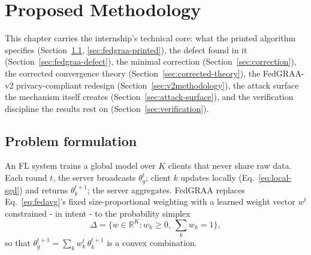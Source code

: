 \documentclass[11pt,a4paper]{report}
\newcommand{\simplex}{\Delta}
\begin{document}
\chapter{Proposed Methodology}
\label{ch:methodology}

This chapter carries the internship's technical core: what the printed
algorithm specifies (Section~\ref{sec:problem}, \ref{sec:fedgraa-printed}),
the defect found in it (Section~\ref{sec:fedgraa-defect}), the minimal
correction (Section~\ref{sec:correction}), the corrected convergence theory
(Section~\ref{sec:corrected-theory}), the FedGRAA-v2 privacy-compliant
redesign (Section~\ref{sec:v2methodology}), the attack surface the mechanism
itself creates (Section~\ref{sec:attack-surface}), and the verification
discipline the results rest on (Section~\ref{sec:verification}).

\section{Problem formulation}
\label{sec:problem}

An FL system trains a global model over $K$ clients that never share raw
data. Each round $t$, the server broadcasts $\theta_g^t$; client $k$ updates
locally (Eq.~\eqref{eq:local-sgd}) and returns $\theta_k^{t+1}$; the server
aggregates. FedGRAA replaces Eq.~\eqref{eq:fedavg}'s fixed size-proportional
weighting with a learned weight vector $w^t$ constrained - in intent - to the
probability simplex
\begin{equation}
\simplex = \bigl\{ w \in \mathbb{R}^K : w_k \ge 0,\ \textstyle\sum_k w_k = 1 \bigr\},
\label{eq:simplex}
\end{equation}
so that $\theta_g^{t+1}=\sum_k w_k^t\,\theta_k^{t+1}$ is a convex combination.
\end{document}
